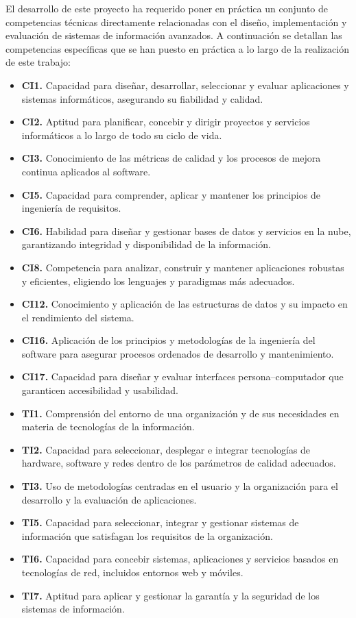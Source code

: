 \begin{large}

El desarrollo de este proyecto ha requerido poner en práctica un conjunto de competencias técnicas directamente relacionadas con el diseño, implementación y evaluación de sistemas de información avanzados. A continuación se detallan las competencias específicas que se han puesto en práctica a lo largo de la realización de este trabajo:

\begin{itemize}[label=\raisebox{0.15ex}{\scriptsize$\blacksquare$}]
  \item \textbf{CI1.} Capacidad para diseñar, desarrollar, seleccionar y evaluar aplicaciones y sistemas informáticos, asegurando su fiabilidad y calidad.
  \item \textbf{CI2.} Aptitud para planificar, concebir y dirigir proyectos y servicios informáticos a lo largo de todo su ciclo de vida.
  \item \textbf{CI3.} Conocimiento de las métricas de calidad y los procesos de mejora continua aplicados al software.
  \item \textbf{CI5.} Capacidad para comprender, aplicar y mantener los principios de ingeniería de requisitos.
  \item \textbf{CI6.} Habilidad para diseñar y gestionar bases de datos y servicios en la nube, garantizando integridad y disponibilidad de la información.
  \item \textbf{CI8.} Competencia para analizar, construir y mantener aplicaciones robustas y eficientes, eligiendo los lenguajes y paradigmas más adecuados.
  \item \textbf{CI12.} Conocimiento y aplicación de las estructuras de datos y su impacto en el rendimiento del sistema.
  \item \textbf{CI16.} Aplicación de los principios y metodologías de la ingeniería del software para asegurar procesos ordenados de desarrollo y mantenimiento.
  \item \textbf{CI17.} Capacidad para diseñar y evaluar interfaces persona–computador que garanticen accesibilidad y usabilidad.
  \item \textbf{TI1.} Comprensión del entorno de una organización y de sus necesidades en materia de tecnologías de la información.
  \item \textbf{TI2.} Capacidad para seleccionar, desplegar e integrar tecnologías de hardware, software y redes dentro de los parámetros de calidad adecuados.
  \item \textbf{TI3.} Uso de metodologías centradas en el usuario y la organización para el desarrollo y la evaluación de aplicaciones.
  \item \textbf{TI5.} Capacidad para seleccionar, integrar y gestionar sistemas de información que satisfagan los requisitos de la organización.
  \item \textbf{TI6.} Capacidad para concebir sistemas, aplicaciones y servicios basados en tecnologías de red, incluidos entornos web y móviles.
  \item \textbf{TI7.} Aptitud para aplicar y gestionar la garantía y la seguridad de los sistemas de información.
\end{itemize}


\end{large}
